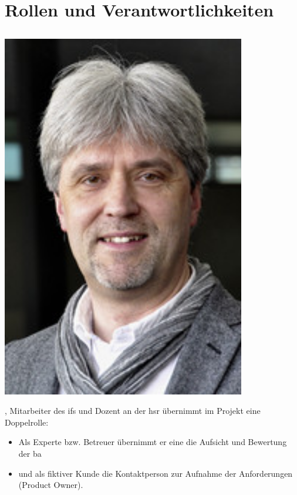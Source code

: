 \chapter{Rollen und Verantwortlichkeiten}

\section{\proff}

\begin{minipage}[t]{0.25\textwidth}
	\vspace{0pt}
	\includegraphics[width=0.8\textwidth]{fig/sfkeller}
\end{minipage}
\begin{minipage}[t]{0.8\textwidth}
	\vspace{0pt}
	\prof, Mitarbeiter des \gls{ifs} und Dozent an der \gls{hsr} übernimmt im Projekt eine Doppelrolle:
	\begin{itemize}
		\item Als Experte bzw. Betreuer übernimmt er eine die Aufsicht und Bewertung der \acl{ba}
		\item und als fiktiver Kunde die Kontaktperson zur Aufnahme der Anforderungen (Product Owner).
	\end{itemize}
\end{minipage}


